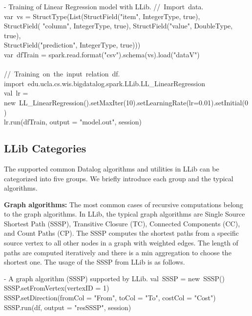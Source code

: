 \vspace{0.5em}
 - Training of Linear Regression model with LLib.
\bldl
//\ Import\ data. 
\\
var\ vs = StructType(List(StructField("item", IntegerType, true), \\StructField(
"column", IntegerType, true),
StructField("value", DoubleType, true),\\ StructField("prediction", IntegerType, true))) \\

var\ dfTrain = spark.read.format("csv").schema(vs).load("dataV") \\
\\
//\ Training\ on\ the\ input\ relation\ df. \\
import\ edu.ucla.cs.wis.bigdatalog.spark.LLib.LL\_LinearRegression \\
val\ lr = new\  LL\_LinearRegression().setMaxIter(10).setLearningRate(lr=0.01).setInitial(0) \\
lr.run(dfTrain, output = "model.out", session)

\eldl


\iffalse
\subsection{LLib Categories}
The supported common Datalog algorithms and utilities in LLib can be  categorized into five groups. We briefly introduce each group and the typical algorithms. 

\textbf{Graph algorithms:} The most common cases of recursive computations  belong to the graph algorithms. In LLib, the typical graph algorithms are Single Source Shortest Path (SSSP), Transitive Closure (TC), Connected Components (CC), and Count Paths (CP). The SSSP  computes the shortest paths from a specific source vertex to all other nodes in a graph with weighted edges. The length of paths are computed iteratively and there is a min aggregation to choose the shortest one. The usage of the SSSP from LLib is as follows.

\vspace{0.5em}
 - A graph algorithm (SSSP) supported by LLib.
\bldl
val\ SSSP = new\ SSSP() \\
SSSP.setFromVertex(vertexID = 1) \\
SSSP.setDirection(fromCol = "From", toCol = "To", costCol = "Cost") \\
SSSP.run(df, output = "resSSSP", session) \\

